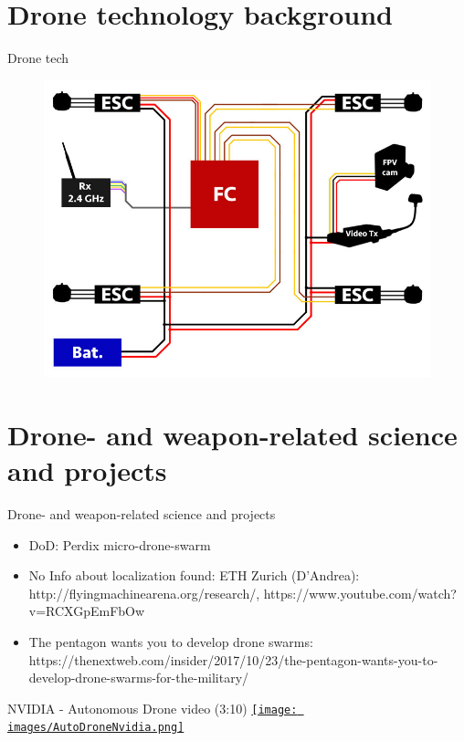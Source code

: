 \documentclass[aspectratio=169]{beamer}
\begin{document}
\section{Drone technology background}
\begin{frame}{Drone tech}
	\begin{figure}
		\includegraphics[width=0.6\linewidth]{images/06-FPV-Overview_1.jpg}
	\end{figure}
	\color{gray}{http://fpvracing.ch/img/cms/infobereich/Bauanleitung/06-FPV-Overview\_1.jpg}
\end{frame}

\section{Drone- and weapon-related science and projects}
\begin{frame}{Drone- and weapon-related science and projects}
	\begin{itemize}
		\item DoD: Perdix micro-drone-swarm
		\item No Info about localization found: ETH Zurich (D'Andrea): http://flyingmachinearena.org/research/, https://www.youtube.com/watch?v=RCXGpEmFbOw
        \item The pentagon wants you to develop drone swarms: https://thenextweb.com/insider/2017/10/23/the-pentagon-wants-you-to-develop-drone-swarms-for-the-military/
	\end{itemize}
\end{frame}

\begin{frame}{NVIDIA - Autonomous Drone video (3:10)}
        	\centering
            \href{run:./videos/AutoDroneNvidia.mp4?autostart}
            {\texttt{[image: images/AutoDroneNvidia.png]}}
\end{frame}
\end{document}
